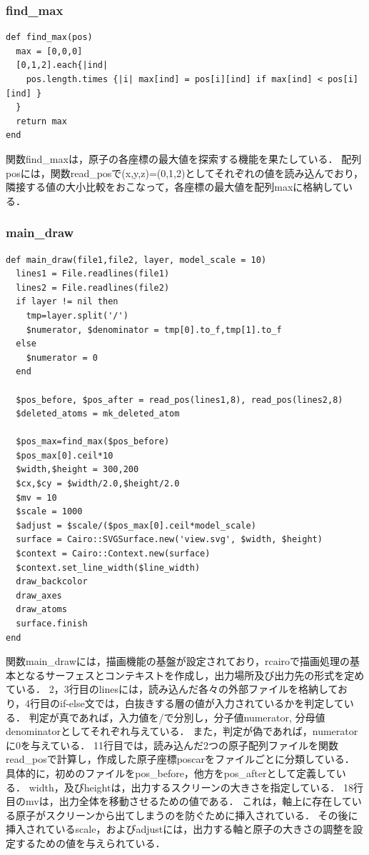 \subsubsection{find\_max}\begin{lstlisting}[style=customRuby,basicstyle={\scriptsize\ttfamily}]
def find_max(pos)
  max = [0,0,0]
  [0,1,2].each{|ind|
    pos.length.times {|i| max[ind] = pos[i][ind] if max[ind] < pos[i][ind] }
  }
  return max
end
\end{lstlisting}
関数find\_maxは，原子の各座標の最大値を探索する機能を果たしている．
配列posには，関数read\_posで(x,y,z)=(0,1,2)としてそれぞれの値を読み込んでおり，隣接する値の大小比較をおこなって，各座標の最大値を配列maxに格納している．

\subsubsection{main\_draw}\begin{lstlisting}[style=customRuby,basicstyle={\scriptsize\ttfamily}]
def main_draw(file1,file2, layer, model_scale = 10)
  lines1 = File.readlines(file1)
  lines2 = File.readlines(file2)
  if layer != nil then
    tmp=layer.split('/')
    $numerator, $denominator = tmp[0].to_f,tmp[1].to_f
  else
    $numerator = 0
  end
  
  $pos_before, $pos_after = read_pos(lines1,8), read_pos(lines2,8)
  $deleted_atoms = mk_deleted_atom
  
  $pos_max=find_max($pos_before)
  $pos_max[0].ceil*10
  $width,$height = 300,200
  $cx,$cy = $width/2.0,$height/2.0
  $mv = 10
  $scale = 1000
  $adjust = $scale/($pos_max[0].ceil*model_scale)
  surface = Cairo::SVGSurface.new('view.svg', $width, $height)
  $context = Cairo::Context.new(surface)
  $context.set_line_width($line_width)
  draw_backcolor
  draw_axes
  draw_atoms
  surface.finish
end
\end{lstlisting}
関数main\_drawには，描画機能の基盤が設定されており，rcairoで描画処理の基本となるサーフェスとコンテキストを作成し，出力場所及び出力先の形式を定めている．
2，3行目のlinesには，読み込んだ各々の外部ファイルを格納しており，4行目のif-else文では，白抜きする層の値が入力されているかを判定している．
判定が真であれば，入力値を/で分別し，分子値numerator, 分母値denominatorとしてそれぞれ与えている．
また，判定が偽であれば，numeratorに0を与えている．
11行目では，読み込んだ2つの原子配列ファイルを関数read\_posで計算し，作成した原子座標poscarをファイルごとに分類している．
具体的に，初めのファイルをpos\_before，他方をpos\_afterとして定義している．
width，及びheightは，出力するスクリーンの大きさを指定している．
18行目のmvは，出力全体を移動させるための値である．
これは，軸上に存在している原子がスクリーンから出てしまうのを防ぐために挿入されている．
その後に挿入されているscale，およびadjustには，出力する軸と原子の大きさの調整を設定するための値を与えられている．

